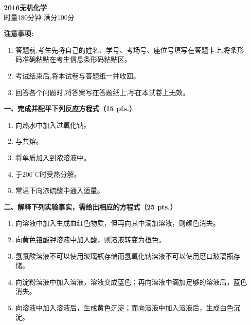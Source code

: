 \begin{center}
    {\LARGE \textbf{2016无机化学}} \\[2ex]
    {\large 时量180分钟 \quad 满分100分}
\end{center}

\vspace{0.5cm}
\noindent\textbf{注意事项:}
\begin{enumerate}[label=\arabic*., parsep=0pt, itemsep=0pt]
    \item 答题前,考生先将自己的姓名、学号、考场号、座位号填写在答题卡上,将条形码准确粘贴在考生信息条形码粘贴区。
    \item 考试结束后,将本试卷与答题纸一并收回。
    \item 回答各个问题时,将答案写在答题纸上,写在本试卷上无效。
\end{enumerate}

\vspace{0.5cm}
\noindent\textbf{一、完成并配平下列反应方程式（15 pts.）}

\begin{enumerate}[label=\arabic*., start=1, itemsep=1.5ex]
    \item 向热水中加入过氧化钠。
    \item {}与共熔。
    \item 将单质加入到浓溶液中。
    \item {}于$200^\circ\text{C}$时受热分解。
    \item 常温下向浓硫酸中通入适量。
\end{enumerate}

\vspace{0.5cm}
\noindent\textbf{二、解释下列实验事实，需给出相应的方程式（25 pts.）}

\begin{enumerate}[label=\arabic*., start=1, itemsep=1.5ex]
    \item 向溶液中加入生成血红色物质，但再向其中滴加溶液，则颜色消失。
    \item 向黄色铬酸钾溶液中加入酸，则溶液转变为橙色。
    \item 氢氟酸溶液不可以使用玻璃瓶存储而氢氧化钠溶液不可以使用磨口玻璃瓶存储。
    \item 向淀粉溶液中加入溶液，溶液变成蓝色；再向溶液中滴加足够的溶液后，蓝色消失。
    \item 向溶液中加入溶液后，生成黄色沉淀；而向溶液中加入溶液后，生成白色沉淀。
\end{enumerate}

